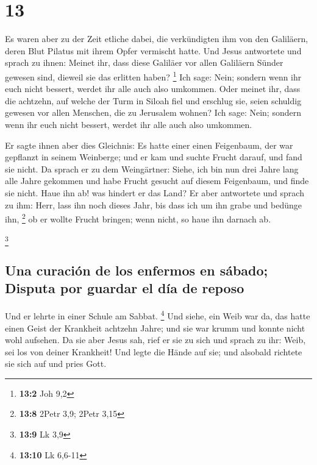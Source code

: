\hypertarget{section-12}{%
\section{13}\label{section-12}}

 Es waren aber zu der Zeit etliche dabei, die verkündigten
ihm von den Galiläern, deren Blut Pilatus mit ihrem Opfer vermischt
hatte.  Und Jesus antwortete und sprach zu ihnen: Meinet
ihr, dass diese Galiläer vor allen Galiläern Sünder gewesen sind,
dieweil sie das erlitten haben? \footnote{\textbf{13:2} Joh 9,2}
 Ich sage: Nein; sondern wenn ihr euch nicht bessert,
werdet ihr alle auch also umkommen.  Oder meinet ihr, dass
die achtzehn, auf welche der Turm in Siloah fiel und erschlug sie, seien
schuldig gewesen vor allen Menschen, die zu Jerusalem wohnen?
 Ich sage: Nein; sondern wenn ihr euch nicht bessert,
werdet ihr alle auch also umkommen.

 Er sagte ihnen aber dies Gleichnis: Es hatte einer einen
Feigenbaum, der war gepflanzt in seinem Weinberge; und er kam und suchte
Frucht darauf, und fand sie nicht.  Da sprach er zu dem
Weingärtner: Siehe, ich bin nun drei Jahre lang alle Jahre gekommen und
habe Frucht gesucht auf diesem Feigenbaum, und finde sie nicht. Haue ihn
ab! was hindert er das Land?  Er aber antwortete und
sprach zu ihm: Herr, lass ihn noch dieses Jahr, bis dass ich um ihn
grabe und bedünge ihn, \footnote{\textbf{13:8} 2Petr 3,9; 2Petr 3,15}
 ob er wollte Frucht bringen; wenn nicht, so haue ihn
darnach ab.

\footnote{\textbf{13:9} Lk 3,9}

\hypertarget{una-curaciuxf3n-de-los-enfermos-en-suxe1bado-disputa-por-guardar-el-duxeda-de-reposo}{%
\subsection{Una curación de los enfermos en sábado; Disputa por guardar
el día de
reposo}\label{una-curaciuxf3n-de-los-enfermos-en-suxe1bado-disputa-por-guardar-el-duxeda-de-reposo}}

 Und er lehrte in einer Schule am Sabbat. \footnote{\textbf{13:10}
  Lk 6,6-11}  Und siehe, ein Weib war da, das hatte einen
Geist der Krankheit achtzehn Jahre; und sie war krumm und konnte nicht
wohl aufsehen.  Da sie aber Jesus sah, rief er sie zu
sich und sprach zu ihr: Weib, sei los von deiner Krankheit!
 Und legte die Hände auf sie; und alsobald richtete sie
sich auf und pries Gott.

